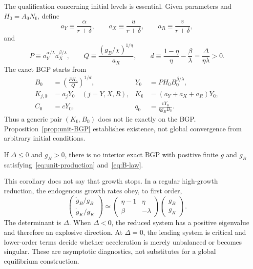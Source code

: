 The qualification concerning initial levels is essential. Given parameters and $H_0=A_0N_0$, define
\begin{equation}
 a_Y\equiv\frac{\alpha}{r+\delta},\qquad
 a_X\equiv\frac{u}{r+\delta},\qquad
 a_R\equiv\frac{v}{r+\delta},
 \label{eq:unit-a}
\end{equation}
and
\begin{equation}
 P\equiv a_Y^{\alpha/\lambda}a_X^{\beta/\lambda},
 \qquad
 Q\equiv\frac{(g_B/\chi)^{1/\eta}}{a_R},
 \qquad
 d\equiv\frac{1-\eta}{\eta}-\frac{\beta}{\lambda}
 =\frac{\Delta}{\eta\lambda}>0.
 \label{eq:unit-level-constants}
\end{equation}
The exact BGP starts from
\begin{align}
 B_0&=\left(\frac{PH_0}{Q}\right)^{1/d},
 &Y_0&=PH_0B_0^{\beta/\lambda},
 \label{eq:unit-B0Y0}\\
 K_{j,0}&=a_jY_0\quad(j=Y,X,R),
 &K_0&=(a_Y+a_X+a_R)Y_0,
 \label{eq:unit-K0}\\
 C_0&=cY_0,
 &q_0&=\frac{vY_0}{\eta g_BB_0}.
 \label{eq:unit-C0q0}
\end{align}
Thus a generic pair $(K_0,B_0)$ does not lie exactly on the BGP. Proposition~\ref{prop:unit-BGP} establishes existence, not global convergence from arbitrary initial conditions.

\begin{corollary}
\label{cor:unit-no-BGP}
If $\Delta\leq0$ and $g_H>0$, there is no interior exact BGP with positive finite $g$ and $g_B$ satisfying~\eqref{eq:unit-production} and~\eqref{eq:B-law}.
\end{corollary}

This corollary does not say that growth stops. In a regular high-growth reduction, the endogenous growth rates obey, to first order,
\begin{equation}
 \begin{pmatrix}
  \dot g_B/g_B\\[2pt]
  \dot g_K/g_K
 \end{pmatrix}
 \simeq
 \begin{pmatrix}
  \eta-1&\eta\\
  \beta&-\lambda
 \end{pmatrix}
 \begin{pmatrix}g_B\\ g_K\end{pmatrix}.
 \label{eq:unit-feedback-matrix}
\end{equation}
The determinant is $\Delta$. When $\Delta<0$, the reduced system has a positive eigenvalue and therefore an explosive direction. At $\Delta=0$, the leading system is critical and lower-order terms decide whether acceleration is merely unbalanced or becomes singular. These are asymptotic diagnostics, not substitutes for a global equilibrium construction.

